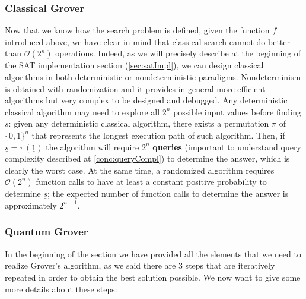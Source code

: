 \documentclass[english]{article}
\begin{document}
			\subsubsection{Classical Grover}
			\label{sec:groverClass}
				Now that we know how the search problem is defined, given the function $f$ introduced above, we have clear in mind that classical search cannot do better than $\mathcal{O}(2^n)$ operations. Indeed, as we will precisely describe at the beginning of the SAT implementation section (\ref{sec:satImpl}), we can design classical algorithms in both deterministic or nondeterministic paradigms. Nondeterminism is obtained with randomization and it provides in general more efficient algorithms but very complex to be designed and debugged. Any deterministic classical algorithm may need to explore all $2^n$ possible input values before finding $\underline{s}$: given any deterministic classical algorithm, there exists a permutation $\pi$ of $\{0,1\}^n$ that represents the longest execution path of such algorithm. Then, if $\underline{s} = \pi(\underline{1})$ the algorithm will require $2^n$ \textbf{queries} (important to understand query complexity described at \ref{conc:queryCompl}) to determine the answer, which is clearly the worst case. At the same time, a randomized algorithm requires $\mathcal{O}(2^n)$ function calls to have at least a constant positive probability to determine $\underline{s}$; the expected number of function calls to determine the answer is approximately $2^{n-1}$.
			
			\subsubsection{Quantum Grover}
			\label{sec:groverQuant}
				In the beginning of the section we have provided all the elements that we need to realize Grover's algorithm, as we said there are 3 steps that are iteratively repeated in order to obtain the best solution possible. We now want to give some more details about these steps:
				
\end{document}
